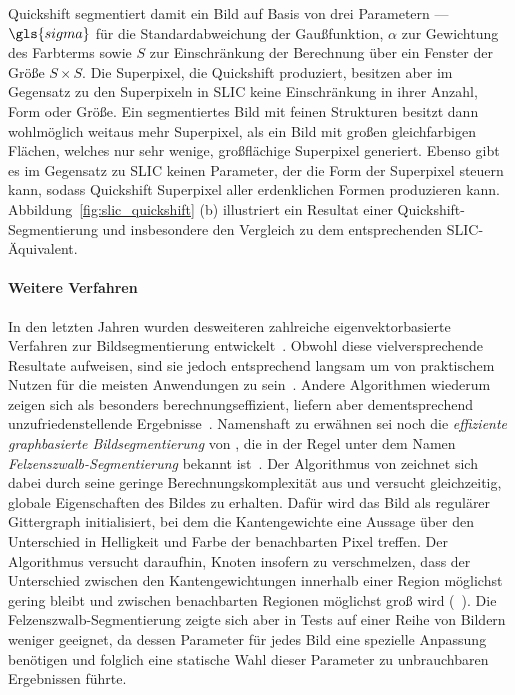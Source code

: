 Quickshift segmentiert damit ein Bild auf Basis von drei Parametern — $\gls{sigma}$ für die  Standardabweichung der Gaußfunktion, $\alpha$ zur Gewichtung des Farbterms sowie $S$ zur Einschränkung der Berechnung über ein Fenster der Größe $S \times S$.
Die Superpixel, die Quickshift produziert, besitzen aber im Gegensatz zu den Superpixeln in \gls{SLIC} keine Einschränkung in ihrer Anzahl, Form oder Größe.
Ein segmentiertes Bild mit feinen Strukturen besitzt dann wohlmöglich weitaus mehr Superpixel, als ein Bild mit großen gleichfarbigen Flächen, welches nur sehr wenige, großflächige Superpixel generiert.
Ebenso gibt es im Gegensatz zu \gls{SLIC} keinen Parameter, der die Form der Superpixel steuern kann, sodass Quickshift Superpixel aller erdenklichen Formen produzieren kann.
Abbildung~\ref{fig:slic_quickshift} (b) illustriert ein Resultat einer Quickshift-Segmentierung und insbesondere den Vergleich zu dem entsprechenden \gls{SLIC}-Äquivalent.

\paragraph{Weitere Verfahren}
\label{weitere_superpixel_verfahren}

In den letzten Jahren wurden desweiteren zahlreiche eigenvektorbasierte Verfahren zur Bildsegmentierung entwickelt~\cite{super, felzenszwalb}.
Obwohl diese vielversprechende Resultate aufweisen, sind sie jedoch entsprechend langsam um von praktischem Nutzen für die meisten Anwendungen zu sein~\cite{felzenszwalb}.
Andere Algorithmen wiederum zeigen sich als besonders berechnungseffizient, liefern aber dementsprechend unzufriedenstellende Ergebnisse~\cite{felzenszwalb}.
Namenshaft zu erwähnen sei noch die \emph{effiziente graphbasierte Bildsegmentierung} von \citeauthor{felzenszwalb}, die in der Regel unter dem Namen \emph{Felzenszwalb-Segmentierung} bekannt ist~\cite{felzenszwalb}.
Der Algorithmus von \citeauthor{felzenszwalb} zeichnet sich dabei durch seine geringe Berechnungskomplexität aus und versucht gleichzeitig, globale Eigenschaften des Bildes zu erhalten.
Dafür wird das Bild als regulärer Gittergraph initialisiert, bei dem die Kantengewichte eine Aussage über den Unterschied in Helligkeit und Farbe der benachbarten Pixel treffen.
Der Algorithmus versucht daraufhin, Knoten insofern zu verschmelzen, dass der Unterschied zwischen den Kantengewichtungen innerhalb einer Region möglichst gering bleibt und zwischen benachbarten Regionen möglichst groß wird (\vgl{}~\cite{felzenszwalb}).
Die Felzenszwalb-Segmentierung zeigte sich aber in Tests auf einer Reihe von Bildern weniger geeignet, da dessen Parameter für jedes Bild eine spezielle Anpassung benötigen und folglich eine statische Wahl dieser Parameter zu unbrauchbaren Ergebnissen führte.
